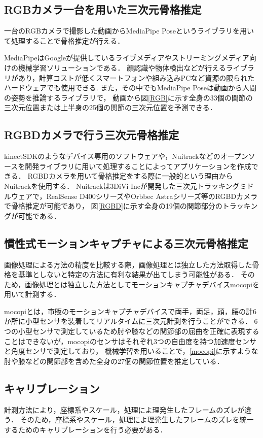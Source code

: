 \documentclass[titlepage]{jarticle}
\begin{document}
\subsection{RGBカメラ一台を用いた三次元骨格推定}\label{RGB_sec}
%
一台のRGBカメラで撮影した動画からMediaPipe Pose\cite{mediapipe}というライブラリを用いて処理することで骨格推定が行える．

MediaPipeはGoogleが提供しているライブメディアやストリーミングメディア向けの機械学習ソリューションである．
顔認識や物体検出などが行えるライブラリがあり，計算コストが低くスマートフォンや組み込みPCなど資源の限られたハードウェアでも使用できる.
また，その中でもMediaPipe Poseは動画から人間の姿勢を推論するライブラリで，
動画から図\ref{RGB}に示す全身の33個の関節の三次元位置または上半身の25個の関節の三次元位置を予測できる．

\subsection{RGBDカメラで行う三次元骨格推定}\label{RGBD_sec}
kinectSDK\cite{kinectSDK}のようなデバイス専用のソフトウェアや，Nuitrack\cite{nuitrack}などのオープンソースを開発ライブラリに用いて処理することによってアプリケーションを作成できる．
RGBDカメラを用いて骨格推定をする際に一般的という理由からNuitrackを使用する．
Nuitrackは3DiVi Incが開発した三次元トラッキングミドルウェアで，RealSense D400シリーズやOrbbec Astraシリーズ等のRGBDカメラで骨格推定が可能であり，
図\ref{RGBD}に示す全身の19個の関節部分のトラッキングが可能である．
%
\subsection{慣性式モーションキャプチャによる三次元骨格推定}
画像処理による方法の精度を比較する際，画像処理とは独立した方法取得した骨格を基準としないと特定の方法に有利な結果が出てしまう可能性がある．
そのため，画像処理とは独立した方法としてモーションキャプチャデバイスmocopiを用いて計測する．

mocopiとは，市販のモーションキャプチャデバイスで両手，両足，頭，腰の計6か所に小型センサを装着してリアルタイムに三次元計測を行うことができる．
6つの小型センサで測定しているため肘や膝などの関節部の屈曲を正確に表現することはできないが，mocopiのセンサはそれぞれ3つの自由度を持つ加速度センサと角度センサで測定しており，
機械学習を用いることで，\ref{mocopi}に示すような肘や膝などの関節部を含めた全身の27個の関節位置を推定している．

\subsection{キャリブレーション}
計測方法により，座標系やスケール，処理によ理発生したフレームのズレが違う．
そのため，座標系やスケール，処理によ理発生したフレームのズレを統一するためのキャリブレーションを行う必要がある．
\end{document}
